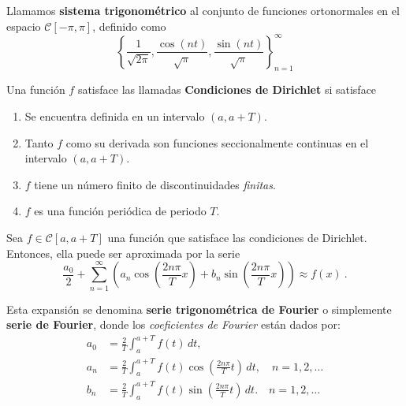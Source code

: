 \begin{defi} 
    Llamamos \textbf{sistema trigonométrico} al conjunto de funciones ortonormales en el espacio $\mathscr{C}[-\pi,\pi]$, definido como
    $$\left\{ \frac{1}{\sqrt{2\pi}}, \frac{\cos(nt)}{\sqrt{\pi}}, \frac{\sin(nt)}{\sqrt{\pi}} \right\}_{n=1}^{\infty}$$
\end{defi}

\begin{defi} 
    Una función $f$ satisface las llamadas \textbf{Condiciones de Dirichlet} si satisface
    \begin{enumerate}
        \item Se encuentra definida en un intervalo $(a,a+T)$.
        \item Tanto $f$ como su derivada son funciones seccionalmente continuas en el intervalo $(a,a+T)$.
        \item $f$ tiene un número finito de discontinuidades \emph{finitas}.
        \item $f$ es una función periódica de periodo $T$.
    \end{enumerate}

\end{defi}

\begin{defi} 
Sea $f \in \mathscr{C}[a, a+T]$ una función que satisface las condiciones de Dirichlet. Entonces, ella puede ser aproximada por la serie 
\begin{equation}
    \frac{a_0}{2} + \sum_{n=1}^{\infty} \left( a_n \cos\left( \frac{2n\pi}{T}x \right) + b_n \sin\left( \frac{2n\pi}{T}x \right) \right) \approx f(x) \ . \label{FourierTrigo}
\end{equation}

Esta expansión se denomina \textbf{serie trigonométrica de Fourier} o simplemente \textbf{serie de Fourier}, donde los \textit{coeficientes de Fourier} están dados por:
\begin{align*}
    a_0 &= \frac{2}{T} \int_{a}^{a+T} f(t) \,dt, \\
    a_n &= \frac{2}{T} \int_{a}^{a+T} f(t) \cos\left( \frac{2n\pi}{T}t \right) \,dt, \quad n = 1,2, \dots\\
    b_n &= \frac{2}{T} \int_{a}^{a+T} f(t) \sin\left( \frac{2n\pi}{T}t \right) \,dt. \quad n = 1,2, \dots
\end{align*}
\end{defi}

